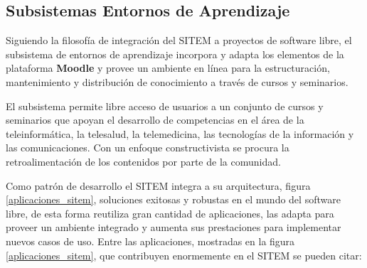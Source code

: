 \subsection{Subsistemas Entornos de Aprendizaje} 
Siguiendo la filosofía de integración del SITEM a proyectos de software libre, el subsistema de entornos de aprendizaje incorpora y adapta los elementos de la plataforma \textbf{Moodle} y provee un ambiente en línea para la estructuración, mantenimiento y distribución de conocimiento a través de cursos y seminarios. 

El subsistema permite libre acceso de usuarios a un conjunto de cursos y seminarios que apoyan el desarrollo de competencias en el área de la teleinformática, la telesalud, la telemedicina, las tecnologías de la información y las comunicaciones. Con un enfoque constructivista se procura la retroalimentación de los contenidos por parte de la comunidad. 

Como patrón de desarrollo el SITEM integra a su arquitectura, figura \ref{aplicaciones_sitem}, soluciones exitosas y robustas en el mundo del software libre, de esta forma reutiliza gran cantidad de aplicaciones, las adapta para proveer un ambiente integrado y aumenta sus prestaciones para implementar nuevos casos de uso. Entre las aplicaciones, mostradas en la figura \ref{aplicaciones_sitem}, que contribuyen enormemente en el SITEM se pueden citar:

